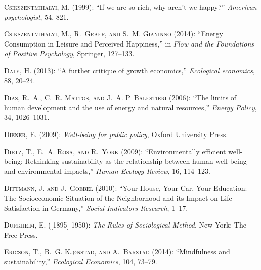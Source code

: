 \documentclass[10pt, letterpaper]{article}
\begin{document}
\begin{spacing}{1.4}
\begin{thebibliography}{36}
\textsc{Csikszentmihalyi, M.} (1999): \enquote{If we are so rich, why aren't we
  happy?} \emph{American psychologist}, 54, 821.

\textsc{Csikszentmihalyi, M., R.~Graef, and S.~M. Gianinno} (2014):
  \enquote{Energy Consumption in Leisure and Perceived Happiness,} in
  \emph{Flow and the Foundations of Positive Psychology}, Springer, 127--133.

\textsc{Daly, H.} (2013): \enquote{A further critique of growth economics,}
  \emph{Ecological economics}, 88, 20--24.

\textsc{Dias, R.~A., C.~R. Mattos, and J.~A. P~Balestieri} (2006): \enquote{The
  limits of human development and the use of energy and natural resources,}
  \emph{Energy Policy}, 34, 1026--1031.

\textsc{Diener, E.} (2009): \emph{Well-being for public policy}, Oxford
  University Press.

\textsc{Dietz, T., E.~A. Rosa, and R.~York} (2009): \enquote{Environmentally
  efficient well-being: Rethinking sustainability as the relationship between
  human well-being and environmental impacts,} \emph{Human Ecology Review}, 16,
  114--123.

\textsc{Dittmann, J. and J.~Goebel} (2010): \enquote{{Your House, Your Car,
  Your Education: The Socioeconomic Situation of the Neighborhood and its
  Impact on Life Satisfaction in Germany},} \emph{Social Indicators Research},
  1--17.

\textsc{Durkheim, E.} ([1895] 1950): \emph{The Rules of Sociological Method},
  New York: The Free Press.

\textsc{Ericson, T., B.~G. Kj{\o}nstad, and A.~Barstad} (2014):
  \enquote{Mindfulness and sustainability,} \emph{Ecological Economics}, 104,
  73--79.


\end{thebibliography}
\end{spacing}
\end{document}
